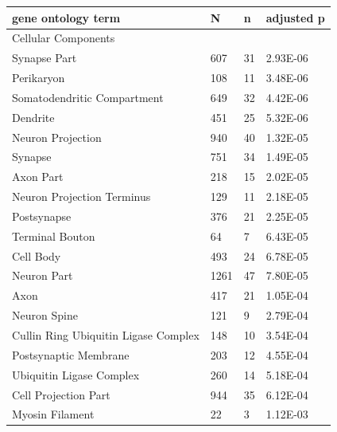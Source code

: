 \begin{refsection}
\begin{table}[H]
\small
{}\selectfont
{} \label{table3S13}
\centering
\begin{tabular}{@{}llll@{}}
\hline
gene ontology term                     & N    & n  & adjusted p \\ \hline
Cellular Components                    &      &    &                  \\
Synapse Part                           & 607  & 31 & 2.93E-06         \\
Perikaryon                             & 108  & 11 & 3.48E-06         \\
Somatodendritic Compartment            & 649  & 32 & 4.42E-06         \\
Dendrite                               & 451  & 25 & 5.32E-06         \\
Neuron Projection                      & 940  & 40 & 1.32E-05         \\
Synapse                                & 751  & 34 & 1.49E-05         \\
Axon Part                              & 218  & 15 & 2.02E-05         \\
Neuron Projection Terminus             & 129  & 11 & 2.18E-05         \\
Postsynapse                            & 376  & 21 & 2.25E-05         \\
Terminal Bouton                        & 64   & 7  & 6.43E-05         \\
Cell Body                              & 493  & 24 & 6.78E-05         \\
Neuron Part                            & 1261 & 47 & 7.80E-05         \\
Axon                                   & 417  & 21 & 1.05E-04         \\
Neuron Spine                           & 121  & 9  & 2.79E-04         \\
Cullin Ring Ubiquitin Ligase Complex   & 148  & 10 & 3.54E-04         \\
Postsynaptic Membrane                  & 203  & 12 & 4.55E-04         \\
Ubiquitin Ligase Complex               & 260  & 14 & 5.18E-04         \\
Cell Projection Part                   & 944  & 35 & 6.12E-04         \\
Myosin Filament                        & 22   & 3  & 1.12E-03         \\

\end{tabular}
\end{table}
\end{refsection}
